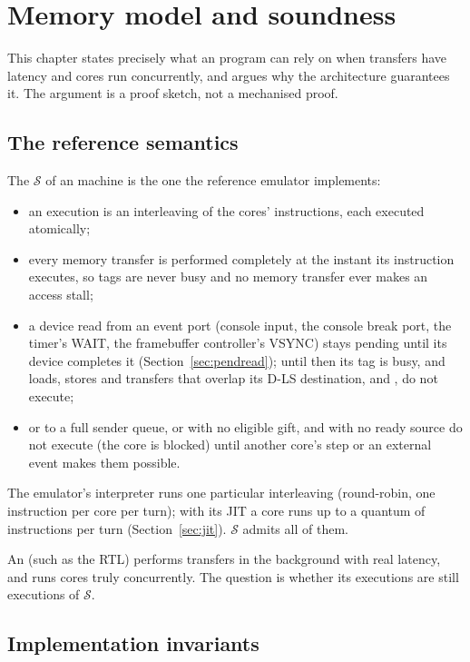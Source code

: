 \chapter{Memory model and soundness}\label{ch:model}

This chapter states precisely what an \IS program can rely on when transfers have latency and cores run
concurrently, and argues why the architecture guarantees it. The argument is a proof sketch, not a
mechanised proof.

\section{The reference semantics}

The  $\mathcal{S}$ of an \IS machine is the one the reference emulator
implements:
\begin{itemize}
\item an execution is an interleaving of the cores' instructions, each executed atomically;
\item every memory transfer is performed completely at the instant its instruction executes, so tags
  are never busy and no memory transfer ever makes an access stall;
\item a device read from an event port (console input, the console break port, the timer's WAIT, the
  framebuffer controller's VSYNC) stays pending until its device completes it
  (Section~\ref{sec:pendread}); until then its tag is busy, and loads, stores and transfers that overlap
  its D-LS destination, and , do not execute;
\item {} or  to a full sender queue,  or  with no eligible
  gift, and  with no ready source do not execute (the core is blocked) until another core's
  step or an external event makes them possible.
\end{itemize}
The emulator's interpreter runs one particular interleaving (round-robin, one instruction per core per
turn); with its JIT a core runs up to a quantum of instructions per turn (Section~\ref{sec:jit}).
$\mathcal{S}$ admits all of them.

An  (such as the RTL) performs transfers in the background with real latency, and
runs cores truly concurrently. The question is whether its executions are still executions of
$\mathcal{S}$.

\section{Implementation invariants}

